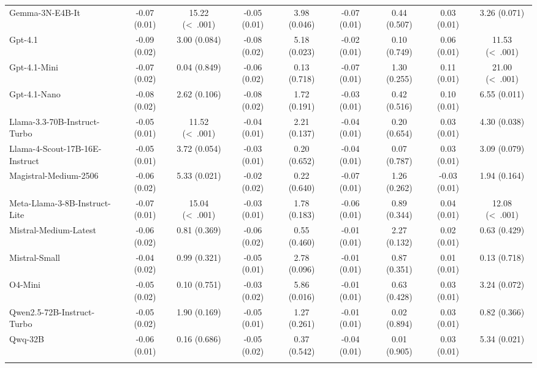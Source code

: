 \documentclass[11pt]{article}
\begin{document}
\begin{landscape}
{\begin{tabular}{l c c c c c c c c}
\addlinespace[0.5em]
Gemma-3N-E4B-It & -0.07 (0.01) & 15.22 (\textless\ .001) & -0.05 (0.01) & 3.98 (0.046) & -0.07 (0.01) & 0.44 (0.507) & 0.03 (0.01) & 3.26 (0.071) \\
\addlinespace[0.5em]
Gpt-4.1 & -0.09 (0.02) & 3.00 (0.084) & -0.08 (0.02) & 5.18 (0.023) & -0.02 (0.01) & 0.10 (0.749) & 0.06 (0.01) & 11.53 (\textless\ .001) \\
\addlinespace[0.5em]
Gpt-4.1-Mini & -0.07 (0.02) & 0.04 (0.849) & -0.06 (0.02) & 0.13 (0.718) & -0.07 (0.01) & 1.30 (0.255) & 0.11 (0.01) & 21.00 (\textless\ .001) \\
\addlinespace[0.5em]
Gpt-4.1-Nano & -0.08 (0.02) & 2.62 (0.106) & -0.08 (0.02) & 1.72 (0.191) & -0.03 (0.01) & 0.42 (0.516) & 0.10 (0.01) & 6.55 (0.011) \\
\addlinespace[0.5em]
Llama-3.3-70B-Instruct-Turbo & -0.05 (0.01) & 11.52 (\textless\ .001) & -0.04 (0.01) & 2.21 (0.137) & -0.04 (0.01) & 0.20 (0.654) & 0.03 (0.01) & 4.30 (0.038) \\
\addlinespace[0.5em]
Llama-4-Scout-17B-16E-Instruct & -0.05 (0.01) & 3.72 (0.054) & -0.03 (0.01) & 0.20 (0.652) & -0.04 (0.01) & 0.07 (0.787) & 0.03 (0.01) & 3.09 (0.079) \\
\addlinespace[0.5em]
Magistral-Medium-2506 & -0.06 (0.02) & 5.33 (0.021) & -0.02 (0.02) & 0.22 (0.640) & -0.07 (0.01) & 1.26 (0.262) & -0.03 (0.01) & 1.94 (0.164) \\
\addlinespace[0.5em]
Meta-Llama-3-8B-Instruct-Lite & -0.07 (0.01) & 15.04 (\textless\ .001) & -0.03 (0.01) & 1.78 (0.183) & -0.06 (0.01) & 0.89 (0.344) & 0.04 (0.01) & 12.08 (\textless\ .001) \\
\addlinespace[0.5em]
Mistral-Medium-Latest & -0.06 (0.02) & 0.81 (0.369) & -0.06 (0.02) & 0.55 (0.460) & -0.01 (0.01) & 2.27 (0.132) & 0.02 (0.01) & 0.63 (0.429) \\
\addlinespace[0.5em]
Mistral-Small & -0.04 (0.02) & 0.99 (0.321) & -0.05 (0.01) & 2.78 (0.096) & -0.01 (0.01) & 0.87 (0.351) & 0.01 (0.01) & 0.13 (0.718) \\
\addlinespace[0.5em]
O4-Mini & -0.05 (0.02) & 0.10 (0.751) & -0.03 (0.02) & 5.86 (0.016) & -0.01 (0.01) & 0.63 (0.428) & 0.03 (0.01) & 3.24 (0.072) \\
\addlinespace[0.5em]
Qwen2.5-72B-Instruct-Turbo & -0.05 (0.02) & 1.90 (0.169) & -0.05 (0.01) & 1.27 (0.261) & -0.01 (0.01) & 0.02 (0.894) & 0.03 (0.01) & 0.82 (0.366) \\
\addlinespace[0.5em]
Qwq-32B & -0.06 (0.01) & 0.16 (0.686) & -0.05 (0.02) & 0.37 (0.542) & -0.04 (0.01) & 0.01 (0.905) & 0.03 (0.01) & 5.34 (0.021) \\
\addlinespace[0.5em]
\bottomrule
\end{tabular}

}
\end{landscape}
\end{document}
